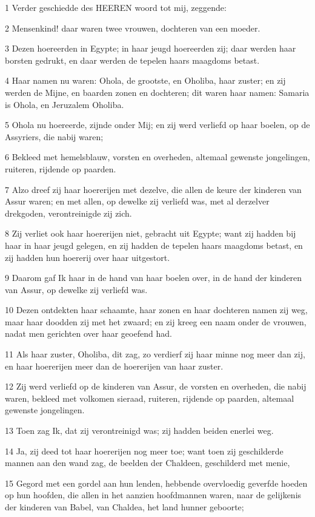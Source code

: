 \par 1 Verder geschiedde des HEEREN woord tot mij, zeggende:
\par 2 Mensenkind! daar waren twee vrouwen, dochteren van een moeder.
\par 3 Dezen hoereerden in Egypte; in haar jeugd hoereerden zij; daar werden haar borsten gedrukt, en daar werden de tepelen haars maagdoms betast.
\par 4 Haar namen nu waren: Ohola, de grootste, en Oholiba, haar zuster; en zij werden de Mijne, en baarden zonen en dochteren; dit waren haar namen: Samaria is Ohola, en Jeruzalem Oholiba.
\par 5 Ohola nu hoereerde, zijnde onder Mij; en zij werd verliefd op haar boelen, op de Assyriers, die nabij waren;
\par 6 Bekleed met hemelsblauw, vorsten en overheden, altemaal gewenste jongelingen, ruiteren, rijdende op paarden.
\par 7 Alzo dreef zij haar hoererijen met dezelve, die allen de keure der kinderen van Assur waren; en met allen, op dewelke zij verliefd was, met al derzelver drekgoden, verontreinigde zij zich.
\par 8 Zij verliet ook haar hoererijen niet, gebracht uit Egypte; want zij hadden bij haar in haar jeugd gelegen, en zij hadden de tepelen haars maagdoms betast, en zij hadden hun hoererij over haar uitgestort.
\par 9 Daarom gaf Ik haar in de hand van haar boelen over, in de hand der kinderen van Assur, op dewelke zij verliefd was.
\par 10 Dezen ontdekten haar schaamte, haar zonen en haar dochteren namen zij weg, maar haar doodden zij met het zwaard; en zij kreeg een naam onder de vrouwen, nadat men gerichten over haar geoefend had.
\par 11 Als haar zuster, Oholiba, dit zag, zo verdierf zij haar minne nog meer dan zij, en haar hoererijen meer dan de hoererijen van haar zuster.
\par 12 Zij werd verliefd op de kinderen van Assur, de vorsten en overheden, die nabij waren, bekleed met volkomen sieraad, ruiteren, rijdende op paarden, altemaal gewenste jongelingen.
\par 13 Toen zag Ik, dat zij verontreinigd was; zij hadden beiden enerlei weg.
\par 14 Ja, zij deed tot haar hoererijen nog meer toe; want toen zij geschilderde mannen aan den wand zag, de beelden der Chaldeen, geschilderd met menie,
\par 15 Gegord met een gordel aan hun lenden, hebbende overvloedig geverfde hoeden op hun hoofden, die allen in het aanzien hoofdmannen waren, naar de gelijkenis der kinderen van Babel, van Chaldea, het land hunner geboorte;
